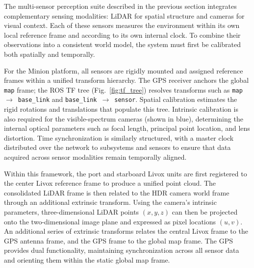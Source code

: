 \documentclass[../main.tex]{subfiles}
\begin{document}
The multi-sensor perception suite described in the previous section integrates complementary sensing modalities: \ac{LiDAR} for spatial structure and cameras for visual context.
Each of these sensors measures the environment within its own local reference frame and according to its own internal clock.
To combine their observations into a consistent world model, the system must first be calibrated both spatially and temporally.

For the Minion platform, all sensors are rigidly mounted and assigned reference frames within a unified transform hierarchy. 
The GPS receiver anchors the global \texttt{map} frame; the ROS TF tree (Fig.~\ref{fig:tf_tree}) resolves transforms such as \texttt{map}\ $\rightarrow$\ \texttt{base\_link} and \texttt{base\_link}\ $\rightarrow$\ \texttt{sensor}. Spatial calibration estimates the rigid rotations and translations that populate this tree.  
Intrinsic calibration is also required for the visible-spectrum cameras (shown in blue), determining the internal optical parameters such as focal length, principal point location, and lens distortion. 
Time synchronization is similarly structured, with a master clock distributed over the network to subsystems and sensors to ensure that data acquired across sensor modalities remain temporally aligned.

Within this framework, the port and starboard Livox units are first registered to the center Livox reference frame to produce a unified point cloud. 
The consolidated LiDAR frame is then related to the HDR camera world frame through an additional extrinsic transform. 
Using the camera’s intrinsic parameters, three-dimensional LiDAR points $(x, y, z)$ can then be projected onto the two-dimensional image plane and expressed as pixel locations $(u, v)$. 
An additional series of extrinsic transforms relates the central Livox frame to the \ac{GPS} antenna frame, and the \ac{GPS} frame to the global map frame. 
The \ac{GPS} provides dual functionality, maintaining synchronization across all sensor data and orienting them within the static global map frame.
\end{document}
